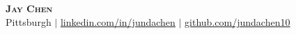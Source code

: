 
\begin{center}
    \textbf{\Huge \scshape Jay Chen} \\ \vspace{1pt}
    \small Pittsburgh 
    $|$
    \href{https://linkedin.com/in/jundachen}{\underline{linkedin.com/in/jundachen}} 
    $|$
    \href{https://github.com/jundachen10}{\underline{github.com/jundachen10}}
\end{center}